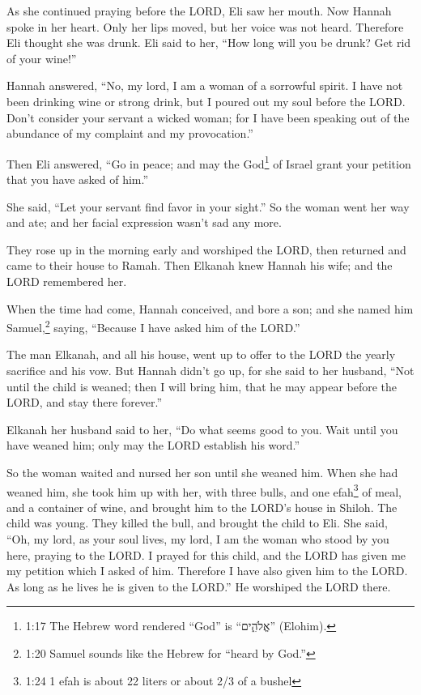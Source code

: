 \myverse{}As she continued praying before the LORD, Eli saw her mouth.
\myverse{}Now Hannah spoke in her heart. Only her lips moved, but her voice was not
heard. Therefore Eli thought she was drunk.
\myverse{}Eli said to her, “How long will you be drunk? Get rid of your wine!”

\myverse{}Hannah answered, “No, my lord, I am a woman of a sorrowful spirit.
I have not been drinking wine or strong drink, but I poured out my soul before the LORD.
\myverse{}Don’t consider your servant a wicked woman; for I have been speaking out of
the abundance of my complaint and my provocation.”

\myverse{}Then Eli answered, “Go in peace; and may the God\footnote{1:17 The Hebrew word rendered “God” is “אֱלֹהִ֑ים” (Elohim).} of Israel grant your
petition that you have asked of him.”

\myverse{}She said, “Let your servant find favor in your sight.” So the
woman went her way and ate; and her facial expression wasn’t sad any more.

\myverse{}They rose up in the morning early and worshiped the LORD, then
returned and came to their house to Ramah. Then Elkanah knew Hannah his wife; and the LORD remembered
her.

\myverse{}When the time had come, Hannah conceived, and bore a son; and
she named him Samuel,\footnote{1:20 Samuel sounds like the Hebrew for “heard by God.”} saying, “Because I have asked him
of the LORD.”

\myverse{}The man Elkanah, and all his house, went up to offer to the LORD
the yearly sacrifice and his vow.
\myverse{}But Hannah didn’t go up, for she said to her husband, “Not until the child
is weaned; then I will bring him, that he may appear before the LORD, and stay there forever.”

\myverse{}Elkanah her husband said to her, “Do what seems good to you.
Wait until you have weaned him; only may the LORD establish his word.”

So the woman waited and nursed her son until she weaned him.
\myverse{}When she had weaned him, she took him up with her, with three bulls, and one
efah\footnote{1:24 1 efah is about 22 liters or about 2/3 of a bushel} of meal, and a container of wine,
and brought him to the LORD’s house in Shiloh. The child was young.
\myverse{}They killed the bull, and brought the child to Eli.
\myverse{}She said, “Oh, my lord, as your soul lives, my lord, I am the woman who stood
by you here, praying to the LORD.
\myverse{}I prayed for this child, and the LORD has given me my petition which I asked
of him.
\myverse{}Therefore I have also given him to the LORD. As long as he lives he is given
to the LORD.” He worshiped the LORD there.



